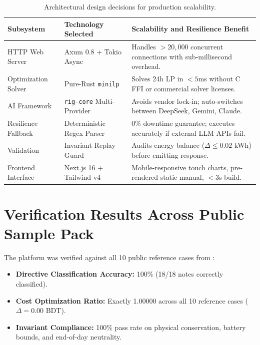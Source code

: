 \documentclass[11pt,a4paper]{article}
\begin{document}
\begin{table}[htbp]
\centering
\small
\begin{tabularx}{\textwidth}{@{}l l X@{}}
\toprule
\textbf{Subsystem} & \textbf{Technology Selected} & \textbf{Scalability and Resilience Benefit} \\
\midrule
HTTP Web Server & Axum 0.8 + Tokio Async & Handles $>20,000$ concurrent connections with sub-millisecond overhead. \\
Optimization Solver & Pure-Rust \texttt{minilp} & Solves 24h LP in $<5$ms without C FFI or commercial solver licenses. \\
AI Framework & \texttt{rig-core} Multi-Provider & Avoids vendor lock-in; auto-switches between DeepSeek, Gemini, Claude. \\
Resilience Fallback & Deterministic Regex Parser & 0\% downtime guarantee; executes accurately if external LLM APIs fail. \\
Validation & Invariant Replay Guard & Audits energy balance ($\Delta \le 0.02$ kWh) before emitting response. \\
Frontend Interface & Next.js 16 + Tailwind v4 & Mobile-responsive touch charts, pre-rendered static manual, $<3$s build. \\
\bottomrule
\end{tabularx}
\caption{Architectural design decisions for production scalability.}
\label{tab:scalability}
\end{table}

\section{Verification Results Across Public Sample Pack}

The platform was verified against all 10 public reference cases from \texttt{}:
\begin{itemize}
    \item \textbf{Directive Classification Accuracy:} 100\% (18/18 notes correctly classified).
    \item \textbf{Cost Optimization Ratio:} Exactly 1.00000 across all 10 reference cases ($\Delta = 0.00$ BDT).
    \item \textbf{Invariant Compliance:} 100\% pass rate on physical conservation, battery bounds, and end-of-day neutrality.
\end{itemize}
\end{document}
